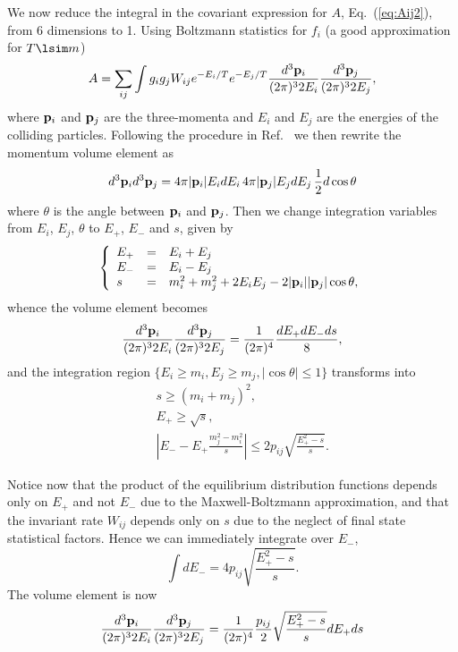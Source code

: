 We now reduce the integral in the covariant expression for $A$,
Eq.~(\ref{eq:Aij2}), from 6 dimensions to 1.
Using Boltzmann statistics for $f_i$ (a good approximation for
$T\lsim m$)
\begin{equation} \label{eq:Aij2b}
  A =
  \sum_{ij} \int g_i g_j W_{ij} e^{-E_{i}/T} e^{-E_{j}/T} 
\frac{d^3{\bf p}_i}{(2\pi)^3 2E_i}
  \frac{d^3{\bf p}_j}{(2\pi)^3 2E_j} ,
\end{equation}
where ${\bf p}_{i}$ and ${\bf p}_{j}$ are the three-momenta and
$E_{i}$ and $E_{j}$ are the energies of the colliding particles.
Following the procedure in Ref.~\cite{GondoloGelmini} we then rewrite
the momentum volume element as
\begin{equation}
  d^3 {\bf p}_{i} d^3 {\bf p}_{j} = 4 \pi |{\bf p}_{i}| E_i dE_{i}
  \, 4 \pi |{\bf p}_{j}| E_j dE_{j} \, \frac{1}{2} d \cos \theta
\end{equation}
where $\theta$ is the angle between ${\bf p}_{i}$ and 
${\bf p}_{j}$. Then we change integration variables from 
$E_{i}$, $E_{j}$, $\theta$ to $E_{+}$, $E_{-}$ and $s$, given by
\begin{equation}
  \left\{ \begin{array}{lcl}
  E_{+} & = & E_{i}+E_{j} \\
  E_{-} & = & E_{i}-E_{j} \\
  s & = & m_{i}^2+m_{j}^2 + 2E_{i}E_{j}-2 |{\bf p}_{i}| |{\bf
    p}_{j}| \cos \theta,
  \end{array} \right.
\end{equation}
whence the volume element becomes
\begin{equation}
  \frac{d^3{\bf p}_i}{(2\pi)^3 2E_i} \frac{d^3{\bf p}_j}{(2\pi)^3 2E_j} =
  \frac{1}{(2\pi)^4} \frac{dE_{+}dE_{-}ds}{8},
\end{equation}
and the integration region $\{ E_i \geq m_i, E_j \geq m_j, |\cos \theta| 
\leq
1\}$ transforms into 
\begin{eqnarray}
  && s \geq (m_i+m_j)^2, \\ && E_{+} \geq \sqrt{s} , \\ && \left\vert
  E_{-} - E_{+} \frac{m_j^2-m_i^2}{s} \right\vert \leq 2 p_{ij}
  \sqrt{\frac{E_{+}^2-s}{s}}.
\end{eqnarray}

Notice now that the product of the equilibrium distribution
functions depends only on $E_{+}$ and not $E_{-}$ due to the
Maxwell-Boltzmann approximation, and that the invariant rate
$W_{ij}$ depends only on $s$ due to the neglect of final state
statistical factors. Hence we can immediately integrate over
$E_{-}$,
\begin{equation}
  \int dE_{-} = 4p_{ij} \sqrt{\frac{E_{+}^2-s}{s}}.
\end{equation}
The volume element is now
\begin{equation}
  \frac{d^3{\bf p}_i}{(2\pi)^3 2E_i} \frac{d^3{\bf p}_j}{(2\pi)^3 2E_j} = 
  \frac{1}{(2\pi)^4} \frac{p_{ij}}{2} \sqrt{\frac{E_{+}^2-s}{s}} 
dE_{+} ds 
\end{equation}

